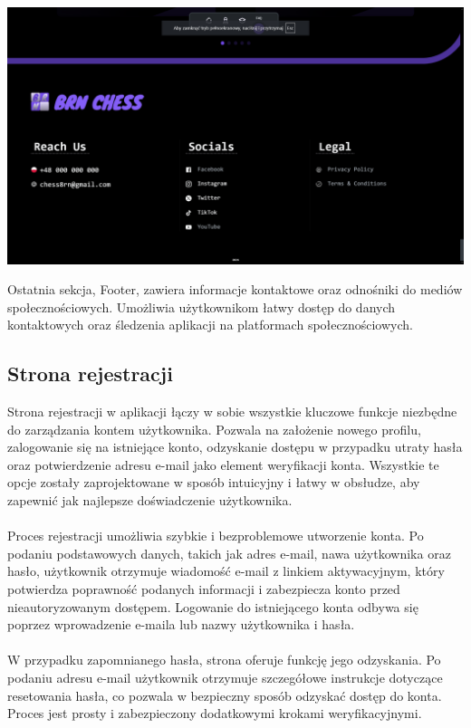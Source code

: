 \documentclass[twoside]{projektInzynierskiMS1}
\begin{document}
\vspace{1cm}

\noindent
\begin{minipage}[t]{0.3\textwidth} 
    \vspace{0pt} 
    \centering 
    \includegraphics[width=\linewidth]{images/ins_footer.png} 
\end{minipage} 
\hfill 
\begin{minipage}[t]{0.6\textwidth} 
    \vspace{0pt} 
    \justifying 
    \noindent 
    Ostatnia sekcja, Footer, zawiera informacje kontaktowe oraz odnośniki do mediów społecznościowych. Umożliwia użytkownikom łatwy dostęp do danych kontaktowych oraz śledzenia aplikacji na platformach społecznościowych.
\end{minipage}

\newpage

\subsection{Strona rejestracji}

\noindent
Strona rejestracji w aplikacji łączy w sobie wszystkie kluczowe funkcje niezbędne do zarządzania kontem użytkownika. Pozwala na założenie nowego profilu, zalogowanie się na istniejące konto, odzyskanie dostępu w przypadku utraty hasła oraz potwierdzenie adresu e-mail jako element weryfikacji konta. Wszystkie te opcje zostały zaprojektowane w sposób intuicyjny i łatwy w obsłudze, aby zapewnić jak najlepsze doświadczenie użytkownika.
\\\\
Proces rejestracji umożliwia szybkie i bezproblemowe utworzenie konta. Po podaniu podstawowych danych, takich jak adres e-mail, nawa użytkownika oraz hasło, użytkownik otrzymuje wiadomość e-mail z linkiem aktywacyjnym, który potwierdza poprawność podanych informacji i zabezpiecza konto przed nieautoryzowanym dostępem. Logowanie do istniejącego konta odbywa się poprzez wprowadzenie e-maila lub nazwy użytkownika i hasła.
\\\\
W przypadku zapomnianego hasła, strona oferuje funkcję jego odzyskania. Po podaniu adresu e-mail użytkownik otrzymuje szczegółowe instrukcje dotyczące resetowania hasła, co pozwala w bezpieczny sposób odzyskać dostęp do konta. Proces jest prosty i zabezpieczony dodatkowymi krokami weryfikacyjnymi.
\end{document}
